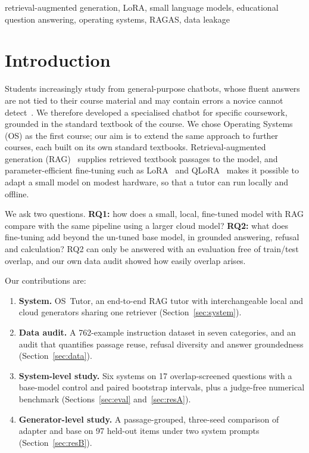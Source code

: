\documentclass[conference]{IEEEtran}
\begin{document}
\begin{IEEEkeywords}
retrieval-augmented generation, LoRA, small language models, educational question answering, operating systems, RAGAS, data leakage
\end{IEEEkeywords}

\section{Introduction}\label{sec:intro}
Students increasingly study from general-purpose chatbots, whose fluent answers are not tied to their course material and may contain errors a novice cannot detect~\cite{kasneci2023edu,ji2023hallucination}. We therefore developed a specialised chatbot for specific coursework, grounded in the standard textbook of the course. We chose Operating Systems (OS) as the first course; our aim is to extend the same approach to further courses, each built on its own standard textbooks. Retrieval-augmented generation (RAG)~\cite{lewis2020rag} supplies retrieved textbook passages to the model, and parameter-efficient fine-tuning such as LoRA~\cite{hu2022lora} and QLoRA~\cite{dettmers2023qlora} makes it possible to adapt a small model on modest hardware, so that a tutor can run locally and offline.

We ask two questions. \textbf{RQ1:} how does a small, local, fine-tuned model with RAG compare with the same pipeline using a larger cloud model? \textbf{RQ2:} what does fine-tuning add beyond the un-tuned base model, in grounded answering, refusal and calculation? RQ2 can only be answered with an evaluation free of train/test overlap, and our own data audit showed how easily overlap arises.

Our contributions are:
\begin{enumerate}
  \item \textbf{System.} OS~Tutor, an end-to-end RAG tutor with interchangeable local and cloud generators sharing one retriever (Section~\ref{sec:system}).
  \item \textbf{Data audit.} A 762-example instruction dataset in seven categories, and an audit that quantifies passage reuse, refusal diversity and answer groundedness (Section~\ref{sec:data}).
  \item \textbf{System-level study.} Six systems on 17 overlap-screened questions with a base-model control and paired bootstrap intervals, plus a judge-free numerical benchmark (Sections~\ref{sec:eval} and~\ref{sec:resA}).
  \item \textbf{Generator-level study.} A passage-grouped, three-seed comparison of adapter and base on 97 held-out items under two system prompts (Section~\ref{sec:resB}).
\end{enumerate}
\end{document}
